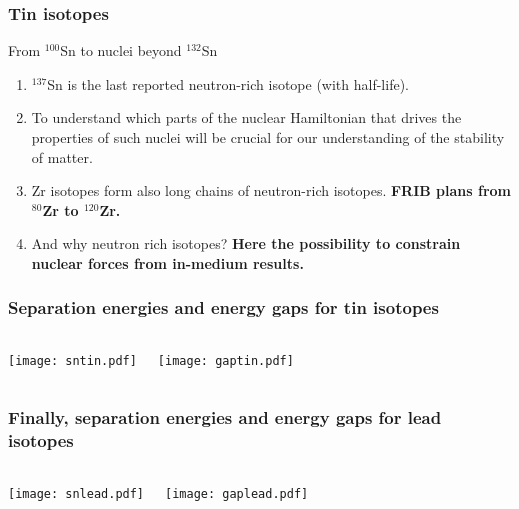 \documentclass[compress]{beamer}
\begin{document}
\frame
{
  \frametitle{Tin isotopes}

  \begin{block}{From $^{100}$Sn to nuclei beyond $^{132}$Sn}
\begin{enumerate}
\item $^{137}$Sn is the last reported neutron-rich isotope (with half-life).
\item To understand which parts of the nuclear Hamiltonian that drives the
properties of such nuclei will be crucial for our understanding of the stability of matter.
\item Zr isotopes form also long chains of neutron-rich isotopes. {\bf FRIB plans from $^{80}$Zr to
$^{120}$Zr.}
\item And why neutron rich isotopes? {\bf Here the possibility to constrain nuclear forces from in-medium results.}
\end{enumerate}
  \end{block}
 }  

\frame
    {
      \frametitle{Separation energies and energy gaps for tin isotopes}
      \begin{footnotesize}
     \begin{columns}
      \column{5.0cm}
      \begin{center}
	\texttt{[image: sntin.pdf]}
      \end{center}
\column{5cm}
      \begin{center}
	\texttt{[image: gaptin.pdf]}
      \end{center}
\end{columns}
      \end{footnotesize}
    }


\frame
    {
      \frametitle{Finally, separation energies and energy gaps for lead isotopes}
      \begin{footnotesize}
     \begin{columns}
      \column{5.0cm}
      \begin{center}
	\texttt{[image: snlead.pdf]}
      \end{center}
\column{5cm}
      \begin{center}
	\texttt{[image: gaplead.pdf]}
      \end{center}
\end{columns}
      \end{footnotesize}
    }
\end{document}
